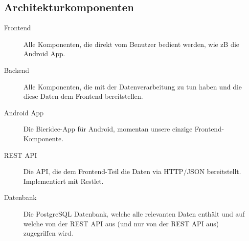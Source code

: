 \documentclass[10pt,a4paper]{scrartcl}
\begin{document}
\subsection{Architekturkomponenten}
\begin{description}
	\item[Frontend] Alle Komponenten, die direkt vom Benutzer bedient werden, wie zB die Android App.
	\item[Backend] Alle Komponenten, die mit der Datenverarbeitung zu tun haben und die diese Daten dem Frontend bereitstellen.
	\item[Android App] Die Bieridee-App für Android, momentan unsere einzige Frontend-Komponente.
	\item[REST API] Die API, die dem Frontend-Teil die Daten via HTTP/JSON bereitstellt. Implementiert mit Restlet.
	\item[Datenbank] Die PostgreSQL Datenbank, welche alle relevanten Daten enthält und auf welche von der REST API aus (und nur von der REST API aus) zugegriffen wird.
\end{description}
\end{document}
